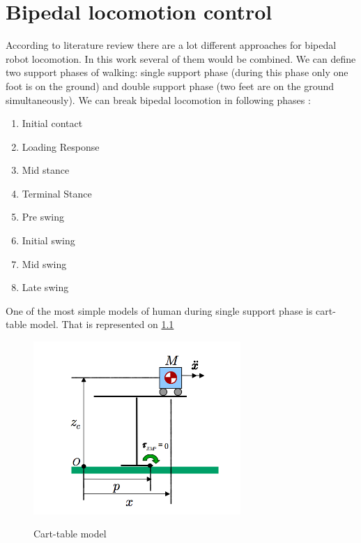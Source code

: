 \documentclass[12pt,a4paper]{report}
\begin{document}
		
	\chapter{Bipedal locomotion control}
		According to literature review there are a lot different approaches for bipedal robot locomotion. In this work several of them would be combined.
		We can define two support phases of walking: single support phase (during this phase only one foot is on the ground) and double support phase (two feet are on the ground simultaneously).
		We can break bipedal locomotion in following phases \cite{rostami1998impactless}:
		
		\begin{enumerate}
			\item Initial contact
			\item Loading Response
			\item Mid stance
			\item Terminal Stance
			\item Pre swing
			\item Initial swing
			\item Mid swing
			\item Late swing			
		\end{enumerate}
		
		One of the most simple models of human during single support phase is cart-table model. That is represented on \cref{fig:6}
		
		\begin{figure}[h!]
			\vspace{-0.2cm}
			\centering
			{\includegraphics[width=0.7\textwidth]{6}}
			\caption{Cart-table model \cite{kajita2003biped}}
			\label{fig:6}
			\vspace{-0.1cm}
		\end{figure}
		
\end{document}
